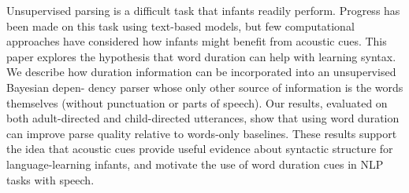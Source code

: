 Unsupervised parsing is a difficult task that infants readily perform. Progress has been made on this task using text-based models, but few computational
 approaches have considered how infants might benefit from acoustic cues. This
 paper explores the hypothesis that word duration can help with learning syntax.
 We describe how duration information can be incorporated into an unsupervised
 Bayesian depen- dency parser whose only other source of information is the
 words themselves (without punctuation or parts of speech). Our results,
 evaluated on both adult-directed and child-directed utterances, show that using
 word duration can improve parse quality relative to words-only baselines. These
 results support the idea that acoustic cues provide useful evidence about
 syntactic structure for language-learning infants, and motivate the use of word
 duration cues in NLP tasks with speech.


